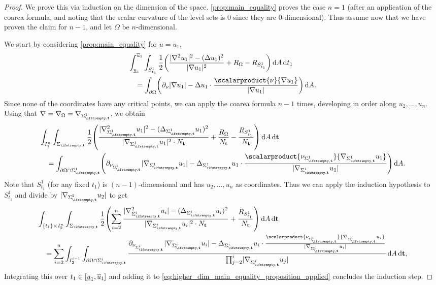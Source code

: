 \documentclass[draft]{amsart}
\newcommand*{\mathcomma}{,}
\newcommand*{\mathfullstop}{.}
\DeclarePairedDelimiter{\parens}{(}{)}
\let\p\parens %
\newcommand*{\laplacian}{\Delta}
\newcommand*{\boundary}{\partial}
\DeclarePairedDelimiter{\abs}{\lvert}{\rvert} %
\begin{document}
\begin{proof}
    We prove this via induction on the dimension of the space. \cref{prop:main_equality} proves the case \( n=1 \) (after an application of the coarea formula, and noting that the scalar curvature of the level sets is \( 0 \) since they are \( 0 \)-dimensional). Thus assume now that we have proven the claim for \( n-1 \), and let \( \Omega \) be \( n \)-dimensional. 

    We start by considering \cref{prop:main_equality} for \( u=u_1 \),
    \begin{align*}
        &\int_{\minu_1}^{\maxu_1}\int_{S_{t_1}^1}\frac{1}{2}\p*{\frac{\abs{\nabla^2 u_1}^2-(\laplacian u_1)^2}{\abs{\nabla u_1}^2}+R_{\Omega}-R_{S_{t_1}^1}}\odif{A}\odif{t_1}\\
        &\quad=\int_{\boundary{\Omega}}\p*{\partial_\nu \abs{\nabla u_1}-\laplacian u_1\cdot \frac{\scalarproduct{\nu}{\nabla u_1}}{\abs{\nabla u_1}}}\odif{A}\mathfullstop
    \end{align*}
    Since none of the coordinates have any critical points, we can apply the coarea formula \( n-1 \) times, developing in order along \( u_2,\dotsc,u_n \). Using that \( \nabla=\nabla_{\Omega}=\nabla_{\nls^1} \), we obtain
    \begin{equation}\label{eq:higher_dim_main_equality_proposition_applied}
        \begin{aligned}
            &\int_{I_{1}^n}\int_{\nls}\frac{1}{2}\p*{\frac{\abs{\nabla_{\nls^1}^2 u_1}^2-(\laplacian_{\nls^1} u_1)^2}{\abs{\nabla_{\nls^1} u_1}^2\cdot N_{\vect{t}}}+\frac{R_{\Omega}}{N_{\vect{t}}}-\frac{R_{S_{t_1}^1}}{N_\vect{t}}}\odif{A}\odif{\vect{t}}\\
            &\quad=\int_{\boundary{\Omega}\cap \nls^1}\p*{\partial_{\nu_{\nls^1}} \abs{\nabla_{\nls^1} u_1}-\laplacian_{\nls^1} u_1\cdot \frac{\scalarproduct{\nu_{\nls^1}}{\nabla_{\nls^1} u_1}}{\abs{\nabla_{\nls^1} u_1}}}\odif{A}\mathfullstop
        \end{aligned}
    \end{equation}
    Note that \( S_{t_1}^1 \) (for any fixed \( t_1 \)) is \( (n-1) \)-dimensional and has \( u_2,\dotsc,u_n \) as coordinates. Thus we can apply the induction hypothesis to \( S_{t_1}^1 \) and divide by \( \abs{\nabla_{\nls^2} u_2} \) to get
    \begin{align*}
        &\int_{\{t_1\}\times I_2^n}\int_{\nls}\frac{1}{2}\p*{\sum_{i=2}^{n}\frac{\abs{\nabla_{\nls^i}^2 u_i}-(\laplacian_{\nls^i}u_i)^2}{\abs{\nabla_{\nls^i}u_i}^2\cdot N_{\vect{t}}}+\frac{R_{S_{t_1}^1}}{N_{\vect{t}}}}\odif{A}\odif{\vect{t}}\\
        &\quad=\sum_{i=2}^{n}\int_{I_2^{i-1}}\int_{\boundary{\Omega}\cap \nls^i}\frac{\partial_{\nu_{\nls^i}}\abs{\nabla_{\nls^i}u_i}-\laplacian_{\nls^i}u_i\cdot\frac{\scalarproduct{\nu_{\nls^i}}{\nabla_{\nls^i}u_i}}{\abs{\nabla_{\nls^i}u_i}}}{\prod_{j=2}^{i}\abs{\nabla_{\nls^j}u_j}}\odif{A}\odif{\vect{t}}\mathcomma
    \end{align*}
    Integrating this over \( t_1\in \interval{\minu_1}{\maxu_1} \) and adding it to \cref{eq:higher_dim_main_equality_proposition_applied} concludes the induction step.
\end{proof}
\end{document}

